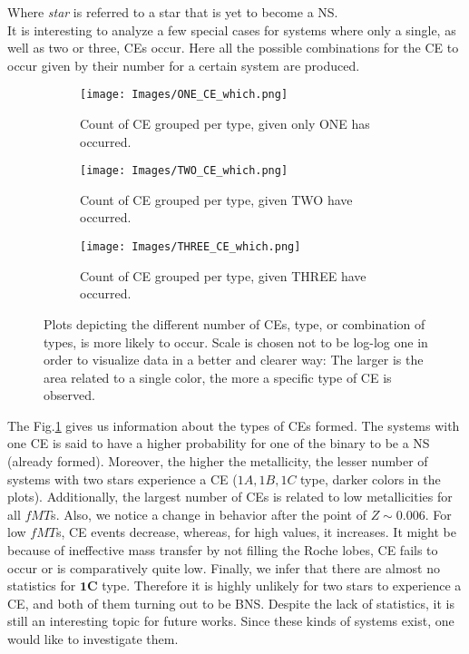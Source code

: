 \documentclass[preprint,12pt]{elsarticle}
\begin{document}
Where \textit{star} is referred to a star that is yet to become a NS.\\

It is interesting to analyze a few special cases for systems where only a single, as well as two or three, CEs occur. Here all the possible combinations for the CE to occur given by their number for a certain system are produced.

\begin{figure}[htp]
    \begin{subfigure}[t]{1\textwidth}
    \centering
        \texttt{[image: Images/ONE\_CE\_which.png]}
        \caption{Count of CE grouped per type, given only ONE has occurred.}
        \label{img:ONE_CE_which}
    \end{subfigure}
    \hfill
    \begin{subfigure}[t]{1\textwidth}
        \centering
        \texttt{[image: Images/TWO\_CE\_which.png]}
        \caption{Count of CE grouped per type, given TWO have occurred.}
        \label{img:TWO_CE_which}
    \end{subfigure} 
    \hfill
    \begin{subfigure}[t]{1\textwidth}
      \centering
      \texttt{[image: Images/THREE\_CE\_which.png]}
      \caption{Count of CE grouped per type, given THREE have occurred.}
      \label{img:THREE_CE_which}
    \end{subfigure} 
    \caption{Plots depicting the different number of CEs, type, or combination of types, is more likely to occur. Scale is chosen not to be log-log one in order to visualize data in a better and clearer way: The larger is the area related to a single color, the more a specific type of CE is observed.}
    \label{img:number_CE_which}
\end{figure}

The Fig.\ref{img:ONE_CE_which} gives us information about the types of CEs formed. The systems with one CE is said to have a higher probability for one of the binary to be a NS (already formed). Moreover, the higher the metallicity, the lesser number of systems with two stars experience a CE ($1A, 1B, 1C$ type, darker colors in the plots). Additionally, the largest number of CEs is related to low metallicities for all $fMT$s. Also, we notice a change in behavior after the point of $Z \sim 0.006$. For low $fMT$s, CE events decrease, whereas, for high values, it increases. It might be because of ineffective mass transfer by not filling the Roche lobes, CE fails to occur or is comparatively quite low. Finally, we infer that there are almost no statistics for $\mathbf{1C}$ type. Therefore it is highly unlikely for two stars to experience a CE, and both of them turning out to be BNS. Despite the lack of statistics, it is still an interesting topic for future works. Since these kinds of systems exist, one would like to investigate them.\\
\end{document}
